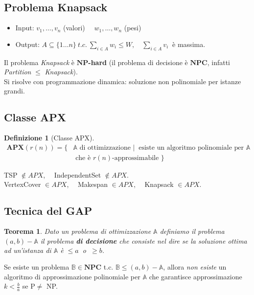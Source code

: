 \documentclass[a4paper]{article}
\newtheorem{thm}{Teorema}[subsection]
\theoremstyle{definition}
\newtheorem{definit}{Definizione}[subsection]
\newcommand{\np}{\mathbf{NP}}
\newcommand{\npc}{\mathbf{NPC}}
\newcommand{\apx}{\mathbf{APX}}
\newcommand{\prob}[1]{\mathbb{#1}}
\begin{document}
		\subsection{Problema Knapsack}
			\begin{itemize}
				\item Input: $ v_1, \dots, v_n $ (valori) $ \quad w_1, \dots, w_n $ (pesi)
				\item Output: $ A \subseteq \{1\dots n \} \ t.c.\ \sum\limits_{i \in A} w_i \leq W,\quad \sum\limits_{i \in A} v_i \ $ è massima.
			\end{itemize}
		
		\noindent
		Il problema \textit{Knapsack} è $\np$\textbf{-hard} (il problema di decisione è $\npc$, infatti \textit{Partition} $\leq$ \textit{Knapsack}).\\
		Si risolve con programmazione dinamica: soluzione non polinomiale per istanze grandi. 
		
		\subsection{Classe APX}
			\begin{definit}[Classe APX]
				\begin{align*}
					\apx(r(n)) = \big\lbrace & \prob{A} \text{ di ottimizzazione } \Big| \ \text{ esiste un algoritmo polinomiale per } \prob{A} \\
					& \text{ che è } r(n)\text{-approssimabile } \big\rbrace
				\end{align*}
			\end{definit}
		
		\noindent
		TSP $\notin APX$, ~~IndependentSet $\notin APX$.\\
		VertexCover $\in APX$, ~~Makespan $\in APX$, ~~Knapsack $\in APX$.
		
		\subsection{Tecnica del GAP}
			\begin{thm}
				Dato un problema di ottimizzazione $ \prob{A} $ definiamo il problema $ (a, b) - \prob{A} $ il problema \textbf{di decisione} che consiste nel dire se la soluzione ottima ad un'istanza di $ \prob{A} $ è $ \leq a \ $ o $ \ \geq b $.
			\end{thm}
		
		\noindent
		Se esiste un problema $\prob{B} \in \npc$ t.c. $\mathbb{B} \leq (a,b)-\prob{A}$, allora \textit{non esiste} un algoritmo di approssimazione polinomiale per $\prob{A}$ che garantisce approssimazione $k < \frac{b}{a}$ se P$\neq$ NP.
		
\end{document}
